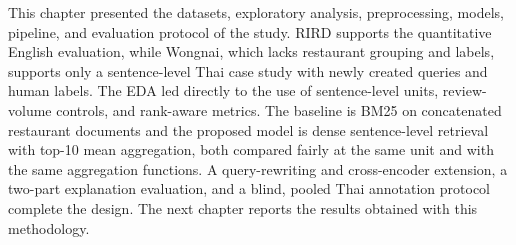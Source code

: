This chapter presented the datasets, exploratory analysis, preprocessing, models, pipeline, and evaluation protocol of the study. RIRD supports the quantitative English evaluation, while Wongnai, which lacks restaurant grouping and labels, supports only a sentence-level Thai case study with newly created queries and human labels. The EDA led directly to the use of sentence-level units, review-volume controls, and rank-aware metrics. The baseline is BM25 on concatenated restaurant documents and the proposed model is dense sentence-level retrieval with top-10 mean aggregation, both compared fairly at the same unit and with the same aggregation functions. A query-rewriting and cross-encoder extension, a two-part explanation evaluation, and a blind, pooled Thai annotation protocol complete the design. The next chapter reports the results obtained with this methodology.
